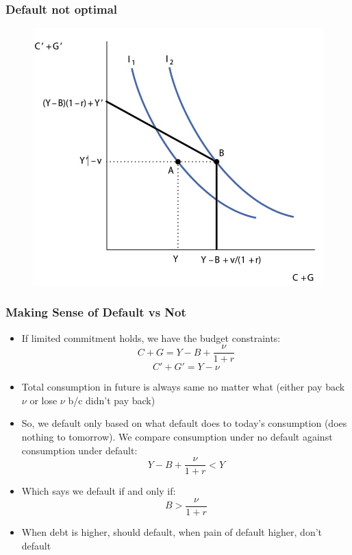 \documentclass{beamer}
\begin{document}
\begin{frame}
\frametitle[alignment=center]{Default not optimal}
\begin{figure}
\centering
\includegraphics[scale=0.7]{Figures/W_Fig_16pt4.png}
\end{figure}
\end{frame}




\begin{frame}
\frametitle[alignment=center]{Making Sense of Default vs Not}
\begin{itemize}
\item If limited commitment holds, we have the budget constraints:
$$C+G=Y-B+\frac{\nu}{1+r}$$
$$C'+G'=Y-\nu$$
\item Total consumption in future is always same no matter what (either pay back $\nu$ or lose $\nu$ b/c didn't pay back)
\bigskip
\item So, we default only based on what default does to today's consumption (does nothing to tomorrow).  We compare consumption under no default against consumption under default:
$$Y-B+\frac{\nu}{1+r}<Y$$
\item Which says we default if and only if:
$$B>\frac{\nu}{1+r}$$
\item When debt is higher, should default, when pain of default higher, don't default
\end{itemize}
\end{frame}
\end{document}
